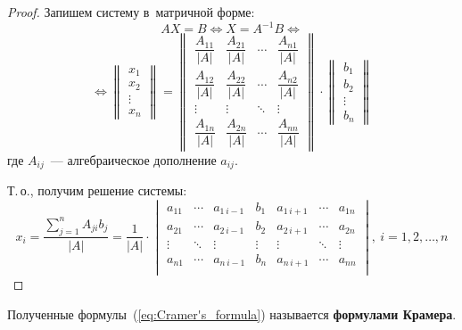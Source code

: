 \begin{proof}
Запишем систему в~матричной форме:
\begin{equation*}
AX = B \Leftrightarrow
X = A^{-1}B \Leftrightarrow
\end{equation*}
\begin{equation*}
\Leftrightarrow
\begin{Vmatrix}
x_1 \\
x_2 \\
\vdots \\
x_n
\end{Vmatrix} =
\begin{Vmatrix}
\dfrac{A_{11}}{|A|} & \dfrac{A_{21}}{|A|} & \cdots & \dfrac{A_{n1}}{|A|} \\
\dfrac{A_{12}}{|A|} & \dfrac{A_{22}}{|A|} & \cdots & \dfrac{A_{n2}}{|A|} \\
\vdots & \vdots & \ddots & \vdots \\
\dfrac{A_{1n}}{|A|} & \dfrac{A_{2n}}{|A|} & \cdots & \dfrac{A_{nn}}{|A|}
\end{Vmatrix} \cdot
\begin{Vmatrix}
b_1 \\
b_2 \\
\vdots \\
b_n
\end{Vmatrix}
\end{equation*}
где $A_{ij}$~--- алгебраическое дополнение $a_{ij}$.

Т.\,о., получим решение системы:
\begin{equation}
\label{eq:Cramer's_formula}
x_i = \frac{\displaystyle \sum_{j=1}^n A_{ji} b_j}{|A|} =
\frac1{{|A|}} \cdot
\begin{vmatrix}
a_{11} & \cdots & a_{1\, i-1} & b_{1} & a_{1\, i+1} & \cdots & a_{1n} \\
a_{21} & \cdots & a_{2\, i-1} & b_{2} & a_{2\, i+1} & \cdots & a_{2n} \\
\vdots & \ddots & \vdots & \vdots & \vdots & \ddots & \vdots \\
a_{n1} & \cdots & a_{n\, i-1} & b_{n} & a_{n\, i+1} & \cdots & a_{nn} \\
\end{vmatrix}, \ i = 1, 2, \ldots, n
\end{equation}
\end{proof}

Полученные формулы~(\ref*{eq:Cramer's_formula}) называется \textbf{формулами Крамера}.